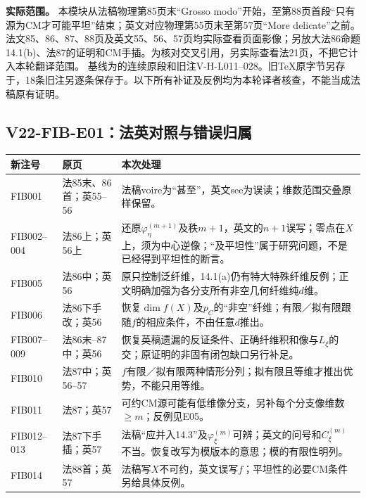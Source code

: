
\noindent\textbf{实际范围。}
本模块从法稿物理第85页末“Grosso modo”开始，至第88页首段“只有源为CM才可能平坦”结束；英文对应物理第55页末至第57页“More delicate”之前。法文85、86、87、88页及英文55、56、57页均实际查看页面影像；另放大法86命题14.1(b)、法87的证明和CM手插。为核对交叉引用，另实际查看法21页，不把它计入本轮翻译范围。
基线为的连续原段和旧注V-H-L011--028。旧TeX原字节另存于，18条旧注另逐条保存于。以下所有补证及反例均为本轮译者核查，不能当成法稿原有证明。

\subsection*{V22-FIB-E01：法英对照与错误归属}

\begin{longtable}{@{}p{.15\linewidth}p{.18\linewidth}p{.56\linewidth}@{}}
\toprule
新注号 & 原页 & 本次处理\\
\midrule\endhead
FIB001 & 法85末、86首；英55--56 & 法稿voire为“甚至”，英文see为误读；维数范围交叠原样保留。\\
FIB002--004 & 法86上；英56上 & 还原$\varphi_\eta^{(m+1)}$及秩$m+1$，英文的$n+1$误写；零点在$X$上，须为中心逆像；“及平坦性”属于研究问题，不是已经得到平坦性的断言。\\
FIB005 & 法86中；英56 & 原只控制泛纤维，14.1(a)仍有特大特殊纤维反例；正文明确加强为各分支所有非空几何纤维纯$d$维。\\
FIB006 & 法86下手改；英56 & 恢复$\dim f(X)$及$p_C$的“非空”纤维；有限／拟有限跟随$f$的相应条件，不由任意$d$推出。\\
FIB007--009 & 法86末--87中；英56 & 恢复英稿遗漏的反证条件、正确纤维积和像与$L_\xi$的交；原证明的非固有闭包缺口另行补足。\\
FIB010 & 法87中；英56--57 & $f$有限／拟有限两种情形分列；拟有限且等维才推出优势，不能只用等维。\\
FIB011 & 法87；英57 & 可约CM源可能有低维像分支，另补每个分支像维数$\geq m$；反例见E05。\\
FIB012--013 & 法87下手插；英57 & 法稿“应并入14.3”及$\varphi_\xi^{(m)}$可辨；英文的问号和$C_\xi^{(m)}$不当。恢复改写为模版本的意思；模的有限性明列。\\
FIB014 & 法88首；英57 & 法稿写$X$不可约，英文误写$f$；平坦性的必要CM条件另给具体反例。\\
\bottomrule
\end{longtable}

